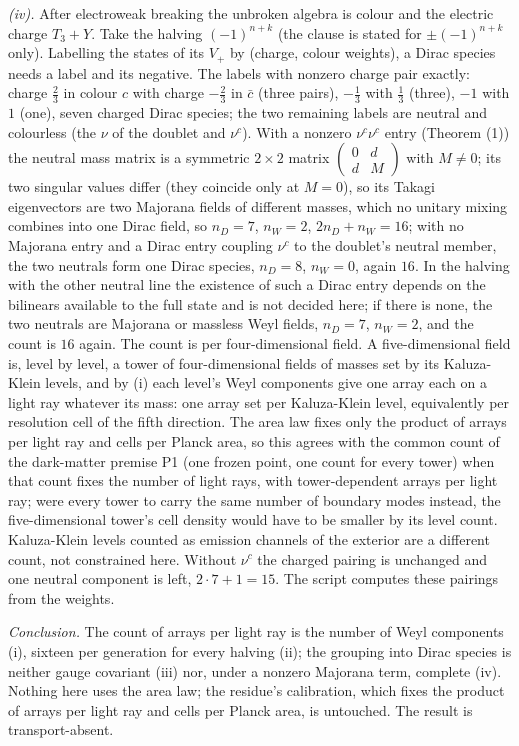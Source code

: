 \emph{(iv).} After electroweak breaking the unbroken algebra is colour and the electric charge $T_{3} + Y$. Take the halving $(-1)^{n + k}$ (the clause is stated for $\pm(-1)^{n + k}$ only). Labelling the states of its $V_{+}$ by (charge, colour weights), a Dirac species needs a label and its negative. The labels with nonzero charge pair exactly: charge $\tfrac23$ in colour $c$ with charge $-\tfrac23$ in $\bar{c}$ (three pairs), $-\tfrac13$ with $\tfrac13$ (three), $-1$ with $1$ (one), seven charged Dirac species; the two remaining labels are neutral and colourless (the $\nu$ of the doublet and $\nu^{c}$). With a nonzero $\nu^{c}\nu^{c}$ entry (Theorem (1)) the neutral mass matrix is a symmetric $2 \times 2$ matrix $\begin{pmatrix} 0 & d \\ d & M \end{pmatrix}$ with $M \neq 0$; its two singular values differ (they coincide only at $M = 0$), so its Takagi eigenvectors are two Majorana fields of different masses, which no unitary mixing combines into one Dirac field, so $n_{D} = 7$, $n_{W} = 2$, $2n_{D} + n_{W} = 16$; with no Majorana entry and a Dirac entry coupling $\nu^{c}$ to the doublet's neutral member, the two neutrals form one Dirac species, $n_{D} = 8$, $n_{W} = 0$, again $16$. In the halving with the other neutral line the existence of such a Dirac entry depends on the bilinears available to the full state and is not decided here; if there is none, the two neutrals are Majorana or massless Weyl fields, $n_{D} = 7$, $n_{W} = 2$, and the count is $16$ again. The count is per four-dimensional field. A five-dimensional field is, level by level, a tower of four-dimensional fields of masses set by its Kaluza-Klein levels, and by (i) each level's Weyl components give one array each on a light ray whatever its mass: one array set per Kaluza-Klein level, equivalently per resolution cell of the fifth direction. The area law fixes only the product of arrays per light ray and cells per Planck area, so this agrees with the common count of the dark-matter premise P1 (one frozen point, one count for every tower) when that count fixes the number of light rays, with tower-dependent arrays per light ray; were every tower to carry the same number of boundary modes instead, the five-dimensional tower's cell density would have to be smaller by its level count. Kaluza-Klein levels counted as emission channels of the exterior are a different count, not constrained here. Without $\nu^{c}$ the charged pairing is unchanged and one neutral component is left, $2 \cdot 7 + 1 = 15$. The script computes these pairings from the weights.

\emph{Conclusion.} The count of arrays per light ray is the number of Weyl components (i), sixteen per generation for every halving (ii); the grouping into Dirac species is neither gauge covariant (iii) nor, under a nonzero Majorana term, complete (iv). Nothing here uses the area law; the residue's calibration, which fixes the product of arrays per light ray and cells per Planck area, is untouched. The result is transport-absent.
